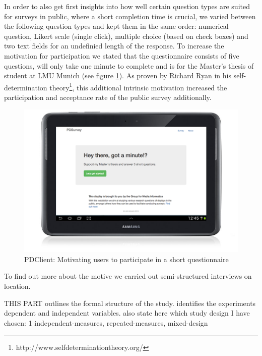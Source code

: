 	In order to also get first insights into how well certain question types are suited for surveys in public, where a short completion time is crucial, we varied between the following question types and kept them in the same order: numerical question, Likert scale (single click), multiple choice (based on check boxes) and two text fields for an undefinied length of the response. To increase the motivation for participation we stated that the questionnaire consists of five questions, will only take one minute to complete and is for the Master's thesis of student at LMU Munich (see figure \ref{fig:5-pdclient-intro}).
	As proven by Richard Ryan in his self-determination theory\cite{ryan2000self}\footnote{http://www.selfdeterminationtheory.org/}, this additional intrinsic motivation increased the participation and acceptance rate of the public survey additionally. 

	\begin{figure}
	    \begin{center}
	        \includegraphics[width=.7\columnwidth]{img/5_field-study/pdclient-startscreen.png}
	    \end{center}
	 \caption{PDClient: Motivating users to participate in a short questionnaire}
	 \label{fig:5-pdclient-intro}
	\end{figure}

	To find out more about the motive we carried out semi-structured interviews on location.



	THIS PART outlines the formal structure of the study. identifies the experiments dependent and independent variables.
	also state here which study design I have chosen: 1 independent-measures, repeated-measures, mixed-design

